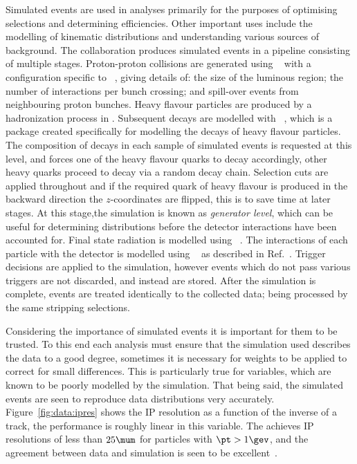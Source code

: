 Simulated events are used in \lhcb analyses primarily for the purposes of optimising selections and
determining efficiencies.
Other important uses include the modelling of kinematic distributions and understanding various
sources of background.
The \lhcb collaboration produces simulated events in a pipeline consisting of multiple stages.
Proton-proton collisions are generated using \pythia~\cite{Sjostrand:2006za,*Sjostrand:2007gs} with
a configuration specific to \lhcb~\cite{LHCb-PROC-2010-056}, giving details of: the size of the
luminous region; the number of interactions per bunch crossing; and spill-over events from
neighbouring proton bunches.
Heavy flavour particles are produced by a hadronization process in \pythia.
Subsequent decays are modelled with
\evtgen~\cite{Lange:2001uf}, which is a package created specifically for modelling the decays of
heavy flavour particles.
The composition of decays in each sample of simulated events is requested at this level, and
\evtgen forces one of the heavy flavour quarks to decay accordingly, other heavy quarks proceed to
decay via a random decay chain.
Selection cuts are applied throughout and if the required quark of heavy
flavour is produced in the backward direction the $z$-coordinates are flipped, this is to save time
at later stages.
At this stage,the simulation is known as \emph{generator level}, which can be useful for
determining distributions before the detector interactions have been accounted for.
Final state radiation is modelled using \photos~\cite{Golonka:2005pn}.
The interactions of each particle with the \lhcb detector is modelled using
\geant~\cite{Allison:2006ve,*Agostinelli:2002hh} as described in Ref.~\cite{LHCb-PROC-2011-006}.
Trigger decisions are applied to the simulation, however events which do not pass various triggers
are not discarded, and instead are stored.
After the simulation is complete, events are treated identically to the collected data; being
processed by the same stripping selections.


Considering the importance of simulated events it is important for them to be trusted.
To this end each analysis must ensure that the simulation used describes the data to a good degree,
sometimes it is necessary for weights to be applied to correct for small differences.
This is particularly true for \pid variables, which are known to be poorly modelled by the
simulation.
That being said, the simulated events are seen to reproduce data distributions very accurately.
Figure~\ref{fig:data:ipres} shows the \gls{IP} resolution as a function of the inverse \pt of a
track, the performance is roughly linear in this variable.
The \velo achieves \gls{IP} resolutions of less than $25\mum$ for particles with $\pt>1\gev$, and
the agreement between data and simulation is seen to be excellent~\cite{LHCb-DP-2014-001}.


